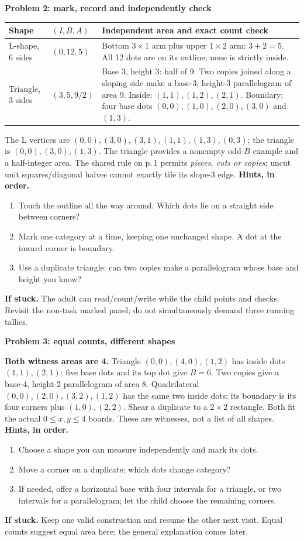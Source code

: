 \documentclass[letterpaper,11pt]{article}
\newcommand{\subhead}[1]{\vspace{2pt}\textbf{#1}\par}
\newcommand{\hints}[3]{\textbf{Hints, in order.}\begin{enumerate}\item #1\item #2\item #3\end{enumerate}}
\begin{document}
\subhead{Problem 2: mark, record and independently check}

\begin{tabularx}{\linewidth}{@{}L{1.25in}L{1.05in}X@{}}\toprule
Shape & $(I,B,A)$ & Independent area and exact count check\\\midrule
L-shape, 6 sides & $(0,12,5)$ & Bottom $3\times1$ arm plus upper $1\times2$ arm: $3+2=5$. All 12 dots are on its outline; none is strictly inside.\\
Triangle, 3 sides & $(3,5,9/2)$ & Base 3, height 3: half of 9. Two copies joined along a sloping side make a base-3, height-3 parallelogram of area 9. Inside: $(1,1),\allowbreak(1,2),\allowbreak(2,1)$. Boundary: four base dots $(0,0),\allowbreak(1,0),\allowbreak(2,0),\allowbreak(3,0)$ and $(1,3)$.\\\bottomrule
\end{tabularx}

The L vertices are $(0,0),\allowbreak(3,0),\allowbreak(3,1),\allowbreak(1,1),\allowbreak(1,3),\allowbreak(0,3)$; the triangle is $(0,0),\allowbreak(3,0),\allowbreak(1,3)$. The triangle provides a nonempty odd-$B$ example and a half-integer area. The shared rule on p.\,1 permits \emph{pieces, cuts or copies}; uncut unit squares/diagonal halves cannot exactly tile its slope-3 edge.
\hints{Touch the outline all the way around. Which dots lie on a straight side between corners?}{Mark one category at a time, keeping one unchanged shape. A dot at the inward corner is boundary.}{Use a duplicate triangle: can two copies make a parallelogram whose base and height you know?}
\textbf{If stuck.} The adult can read/count/write while the child points and checks. Revisit the non-task marked panel; do not simultaneously demand three running tallies.

\subhead{Problem 3: equal counts, different shapes}
\textbf{Both witness areas are 4.} Triangle $(0,0),\allowbreak(4,0),\allowbreak(1,2)$ has inside dots $(1,1),\allowbreak(2,1)$; five base dots and its top dot give $B=6$. Two copies give a base-4, height-2 parallelogram of area 8. Quadrilateral $(0,0),\allowbreak(2,0),\allowbreak(3,2),\allowbreak(1,2)$ has the same two inside dots; its boundary is its four corners plus $(1,0),\allowbreak(2,2)$. Shear a duplicate to a $2\times2$ rectangle. Both fit the actual $0\leq x,y\leq4$ boards. These are witnesses, not a list of all shapes.
\hints{Choose a shape you can measure independently and mark its dots.}{Move a corner on a duplicate; which dots change category?}{If needed, offer a horizontal base with four intervals for a triangle, or two intervals for a parallelogram; let the child choose the remaining corners.}
\textbf{If stuck.} Keep one valid construction and resume the other next visit. Equal counts suggest equal area here; the general explanation comes later.
\newpage
\end{document}
